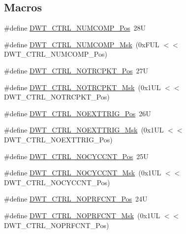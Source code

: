 \subsection*{Macros}
\begin{DoxyCompactItemize}
\item 
\#define \hyperlink{group___c_m_s_i_s___d_w_t_gaac44b9b7d5391a7ffef129b7f6c84cd7}{D\+W\+T\+\_\+\+C\+T\+R\+L\+\_\+\+N\+U\+M\+C\+O\+M\+P\+\_\+\+Pos}~28U
\item 
\#define \hyperlink{group___c_m_s_i_s___d_w_t_gaa3d37d68c2ba73f2026265584c2815e7}{D\+W\+T\+\_\+\+C\+T\+R\+L\+\_\+\+N\+U\+M\+C\+O\+M\+P\+\_\+\+Msk}~(0x\+F\+U\+L $<$$<$ D\+W\+T\+\_\+\+C\+T\+R\+L\+\_\+\+N\+U\+M\+C\+O\+M\+P\+\_\+\+Pos)
\item 
\#define \hyperlink{group___c_m_s_i_s___d_w_t_gaa82840323a2628e7f4a2b09b74fa73fd}{D\+W\+T\+\_\+\+C\+T\+R\+L\+\_\+\+N\+O\+T\+R\+C\+P\+K\+T\+\_\+\+Pos}~27U
\item 
\#define \hyperlink{group___c_m_s_i_s___d_w_t_ga04d8bb0a065ca38e2e5f13a97e1f7073}{D\+W\+T\+\_\+\+C\+T\+R\+L\+\_\+\+N\+O\+T\+R\+C\+P\+K\+T\+\_\+\+Msk}~(0x1\+U\+L $<$$<$ D\+W\+T\+\_\+\+C\+T\+R\+L\+\_\+\+N\+O\+T\+R\+C\+P\+K\+T\+\_\+\+Pos)
\item 
\#define \hyperlink{group___c_m_s_i_s___d_w_t_gad997b9026715d5609b5a3b144eca42d0}{D\+W\+T\+\_\+\+C\+T\+R\+L\+\_\+\+N\+O\+E\+X\+T\+T\+R\+I\+G\+\_\+\+Pos}~26U
\item 
\#define \hyperlink{group___c_m_s_i_s___d_w_t_gacc7d15edf7a27147c422099ab475953e}{D\+W\+T\+\_\+\+C\+T\+R\+L\+\_\+\+N\+O\+E\+X\+T\+T\+R\+I\+G\+\_\+\+Msk}~(0x1\+U\+L $<$$<$ D\+W\+T\+\_\+\+C\+T\+R\+L\+\_\+\+N\+O\+E\+X\+T\+T\+R\+I\+G\+\_\+\+Pos)
\item 
\#define \hyperlink{group___c_m_s_i_s___d_w_t_ga337f6167d960f57f12aa382ffecce522}{D\+W\+T\+\_\+\+C\+T\+R\+L\+\_\+\+N\+O\+C\+Y\+C\+C\+N\+T\+\_\+\+Pos}~25U
\item 
\#define \hyperlink{group___c_m_s_i_s___d_w_t_gaf40c8d7a4fd978034c137e90f714c143}{D\+W\+T\+\_\+\+C\+T\+R\+L\+\_\+\+N\+O\+C\+Y\+C\+C\+N\+T\+\_\+\+Msk}~(0x1\+U\+L $<$$<$ D\+W\+T\+\_\+\+C\+T\+R\+L\+\_\+\+N\+O\+C\+Y\+C\+C\+N\+T\+\_\+\+Pos)
\item 
\#define \hyperlink{group___c_m_s_i_s___d_w_t_gad52a0e5be84363ab166cc17beca0d048}{D\+W\+T\+\_\+\+C\+T\+R\+L\+\_\+\+N\+O\+P\+R\+F\+C\+N\+T\+\_\+\+Pos}~24U
\item 
\#define \hyperlink{group___c_m_s_i_s___d_w_t_gafd8448d7db4bc51f27f202e6e1f27823}{D\+W\+T\+\_\+\+C\+T\+R\+L\+\_\+\+N\+O\+P\+R\+F\+C\+N\+T\+\_\+\+Msk}~(0x1\+U\+L $<$$<$ D\+W\+T\+\_\+\+C\+T\+R\+L\+\_\+\+N\+O\+P\+R\+F\+C\+N\+T\+\_\+\+Pos)
$$
\end{DoxyCompactItemize}
